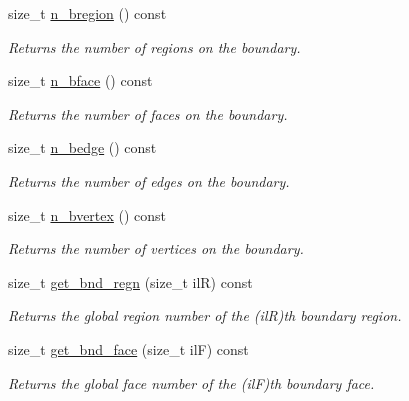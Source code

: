 \begin{DoxyCompactItemize}
size\+\_\+t \hyperlink{classStemMesh3D_1_1mesh__3Dv_a7c885048a027fc84eb6d2b7e2590c5e2}{n\+\_\+bregion} () const
\begin{DoxyCompactList}\small\item\em Returns the number of regions on the boundary. \end{DoxyCompactList}\item 
\mbox{\label{classStemMesh3D_1_1mesh__3Dv_a394bc87d5f29715e6faae1e2d21ceff7}} 
size\+\_\+t \hyperlink{classStemMesh3D_1_1mesh__3Dv_a394bc87d5f29715e6faae1e2d21ceff7}{n\+\_\+bface} () const
\begin{DoxyCompactList}\small\item\em Returns the number of faces on the boundary. \end{DoxyCompactList}\item 
\mbox{\label{classStemMesh3D_1_1mesh__3Dv_aa9793810147053ffdfcd9cc9eeaec160}} 
size\+\_\+t \hyperlink{classStemMesh3D_1_1mesh__3Dv_aa9793810147053ffdfcd9cc9eeaec160}{n\+\_\+bedge} () const
\begin{DoxyCompactList}\small\item\em Returns the number of edges on the boundary. \end{DoxyCompactList}\item 
\mbox{\label{classStemMesh3D_1_1mesh__3Dv_a616550f2a459b5c239d2d205a408b484}} 
size\+\_\+t \hyperlink{classStemMesh3D_1_1mesh__3Dv_a616550f2a459b5c239d2d205a408b484}{n\+\_\+bvertex} () const
\begin{DoxyCompactList}\small\item\em Returns the number of vertices on the boundary. \end{DoxyCompactList}\item 
size\+\_\+t \hyperlink{classStemMesh3D_1_1mesh__3Dv_a91cb00af3bac18dbde6320e4178111ed}{get\+\_\+bnd\+\_\+regn} (size\+\_\+t ilR) const
\begin{DoxyCompactList}\small\item\em Returns the global region number of the (ilR)\textquotesingle{}th boundary region. \end{DoxyCompactList}\item 
size\+\_\+t \hyperlink{classStemMesh3D_1_1mesh__3Dv_a990498932160b3031badb906be06fb84}{get\+\_\+bnd\+\_\+face} (size\+\_\+t ilF) const
\begin{DoxyCompactList}\small\item\em Returns the global face number of the (ilF)\textquotesingle{}th boundary face. \end{DoxyCompactList}\item 

\end{DoxyCompactItemize}
